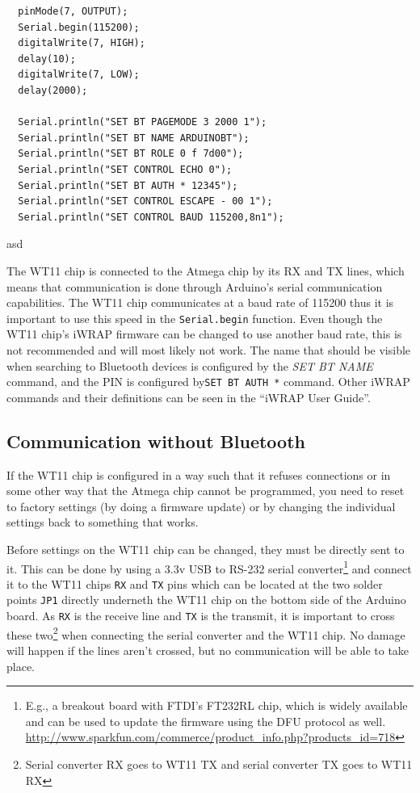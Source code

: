 \documentclass[a4paper, oneside, final]{memoir}
\begin{document}
\begin{table}
  \centering
\begin{verbatim}
  pinMode(7, OUTPUT);
  Serial.begin(115200);
  digitalWrite(7, HIGH);
  delay(10);
  digitalWrite(7, LOW);
  delay(2000);

  Serial.println("SET BT PAGEMODE 3 2000 1");
  Serial.println("SET BT NAME ARDUINOBT");
  Serial.println("SET BT ROLE 0 f 7d00");
  Serial.println("SET CONTROL ECHO 0");
  Serial.println("SET BT AUTH * 12345");
  Serial.println("SET CONTROL ESCAPE - 00 1");
  Serial.println("SET CONTROL BAUD 115200,8n1");
\end{verbatim}
  \caption{asd}
  \label{tab:ArduinoBT:Initial_Setup_code}
\end{table}


The WT11 chip is connected to the Atmega chip by its RX and TX lines, which
means that communication is done through Arduino's serial communication
capabilities. The WT11 chip communicates at a baud rate of 115200 thus it is
important to use this speed in the \texttt{Serial.begin} function. Even though
the WT11 chip's iWRAP firmware can be changed to use another baud rate, this is
not recommended and will most likely not work. The name that should be visible
when searching to Bluetooth devices is configured by the \textit{SET BT NAME}
command, and the PIN is configured by\texttt{SET BT AUTH *} command. Other iWRAP
commands and their definitions can be seen in the ``iWRAP User Guide''.

\subsection{Communication without Bluetooth}

If the WT11 chip is configured in a way such that it refuses connections or in
some other way that the Atmega chip cannot be programmed, you need to reset to
factory settings (by doing a firmware update) or by changing the individual
settings back to something that works. 

Before settings on the WT11 chip can be changed, they must be directly sent to
it. This can be done by using a 3.3v USB to RS-232 serial converter\footnote{E.g., a
  breakout board with FTDI's FT232RL chip, which is widely available and can be
  used to update the firmware using the DFU protocol as well.
  \url{http://www.sparkfun.com/commerce/product_info.php?products_id=718}} and
connect it to the WT11 chips \texttt{RX} and \texttt{TX} pins which can be
located at the two solder points \texttt{JP1} directly underneth the WT11 chip
on the bottom side of the Arduino board. As \texttt{RX} is the receive line and
\texttt{TX} is the transmit, it is important to cross these two\footnote{Serial
  converter RX goes to WT11 TX and serial converter TX goes to WT11 RX} when
connecting the serial converter and the WT11 chip. No damage will happen if the
lines aren't crossed, but no communication will be able to take place.
\end{document}
